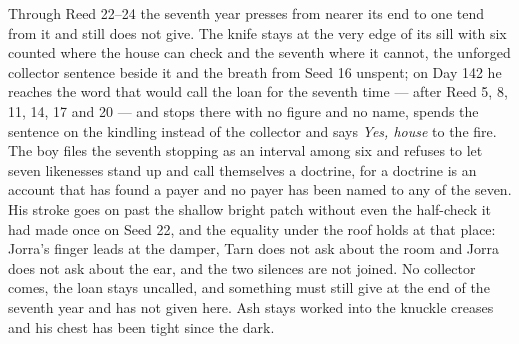 \documentclass{design/chronicle}
\begin{document}
{Through Reed 22–24 the seventh year presses from nearer its end to one tend from it and still does not give. The knife stays at the very edge of its sill with six counted where the house can check and the seventh where it cannot, the unforged collector sentence beside it and the breath from Seed 16 unspent; on Day 142 he reaches the word that would call the loan for the seventh time — after Reed 5, 8, 11, 14, 17 and 20 — and stops there with no figure and no name, spends the sentence on the kindling instead of the collector and says \emph{Yes, house} to the fire. The boy files the seventh stopping as an interval among six and refuses to let seven likenesses stand up and call themselves a doctrine, for a doctrine is an account that has found a payer and no payer has been named to any of the seven. His stroke goes on past the shallow bright patch without even the half-check it had made once on Seed 22, and the equality under the roof holds at that place: Jorra’s finger leads at the damper, Tarn does not ask about the room and Jorra does not ask about the ear, and the two silences are not joined. No collector comes, the loan stays uncalled, and something must still give at the end of the seventh year and has not given here. Ash stays worked into the knuckle creases and his chest has been tight since the dark.

}
\end{document}

